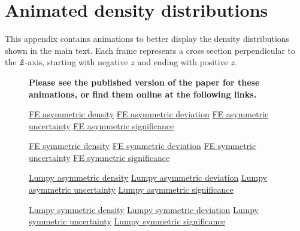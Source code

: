 \section{Animated density distributions}

This appendix contains animations to better display the density distributions shown in the main text. Each frame represents a cross section perpendicular to the $\bm{\hat{z}}$-axis, starting with negative $z$ and ending with positive $z$.

\begin{figure}
  \textbf{Please see the published version of the paper for these animations, or find them online at the following links.}

  \href{https://github.com/jack-dinsmore/asteroid-tidal-torque/tree/main/paper/gifs/asym-fe-d}{FE asymmetric density} \hfill
  \href{https://github.com/jack-dinsmore/asteroid-tidal-torque/tree/main/paper/gifs/asym-fe-s}{FE asymmetric deviation} \hfill
  \href{https://github.com/jack-dinsmore/asteroid-tidal-torque/tree/main/paper/gifs/asym-fe-u}{FE asymmetric uncertainty} \hfill
  \href{https://github.com/jack-dinsmore/asteroid-tidal-torque/tree/main/paper/gifs/asym-fe-r}{FE asymmetric significance}

  \href{https://github.com/jack-dinsmore/asteroid-tidal-torque/tree/main/paper/gifs/sym-fe-d}{FE symmetric density} \hfill
  \href{https://github.com/jack-dinsmore/asteroid-tidal-torque/tree/main/paper/gifs/sym-fe-s}{FE symmetric deviation} \hfill
  \href{https://github.com/jack-dinsmore/asteroid-tidal-torque/tree/main/paper/gifs/sym-fe-u}{FE symmetric uncertainty} \hfill
  \href{https://github.com/jack-dinsmore/asteroid-tidal-torque/tree/main/paper/gifs/sym-fe-r}{FE symmetric significance}

  \href{https://github.com/jack-dinsmore/asteroid-tidal-torque/tree/main/paper/gifs/asym-l-d}{Lumpy asymmetric density} \hfill
  \href{https://github.com/jack-dinsmore/asteroid-tidal-torque/tree/main/paper/gifs/asym-l-s}{Lumpy asymmetric deviation} \hfill
  \href{https://github.com/jack-dinsmore/asteroid-tidal-torque/tree/main/paper/gifs/asym-l-u}{Lumpy asymmetric uncertainty} \hfill
  \href{https://github.com/jack-dinsmore/asteroid-tidal-torque/tree/main/paper/gifs/asym-l-r}{Lumpy asymmetric significance}

  \href{https://github.com/jack-dinsmore/asteroid-tidal-torque/tree/main/paper/gifs/sym-l-d}{Lumpy symmetric density} \hfill
  \href{https://github.com/jack-dinsmore/asteroid-tidal-torque/tree/main/paper/gifs/sym-l-s}{Lumpy symmetric deviation} \hfill
  \href{https://github.com/jack-dinsmore/asteroid-tidal-torque/tree/main/paper/gifs/sym-l-u}{Lumpy symmetric uncertainty} \hfill
  \href{https://github.com/jack-dinsmore/asteroid-tidal-torque/tree/main/paper/gifs/sym-l-r}{Lumpy symmetric significance}


\end{figure}
